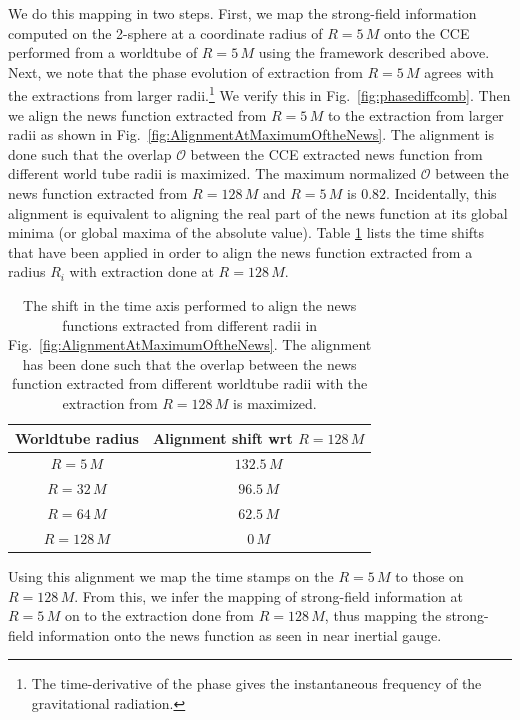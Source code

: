 We do this mapping in two steps. First, we map the strong-field information computed on the 2-sphere at a coordinate radius of $R=5\,M$  onto the CCE performed from a worldtube of  $R=5\,M$ using the framework described above.  Next, we note that the phase evolution of extraction from $R=5\,M$ agrees with the extractions from larger radii.\footnote{The time-derivative of the phase gives the instantaneous frequency of the gravitational radiation.} We verify this in Fig.~\ref{fig:phasediffcomb}. Then we align the news function extracted from $R=5\,M$ to the extraction from larger radii as shown in  Fig.~\ref{fig:AlignmentAtMaximumOftheNews}. The alignment is done such that the overlap $\mathcal{O}$ between the CCE extracted news function from different world tube radii is maximized. The maximum normalized $\mathcal{O}$ between the news function extracted from $R=128\,M$ and $R=5\,M$ is $0.82$. Incidentally, this alignment is equivalent to aligning the real part of the news function at its global minima (or global maxima of the absolute value). Table \ref{tab:Tshift} lists the time shifts that have been applied in order to align the news function extracted from a radius $R_{i}$ with extraction done at $R=128\,M$. 
\begin{table}[!htb]
 \begin{ruledtabular}
    \centering
        \begin{tabular}{ c| c }
Worldtube radius & Alignment shift wrt $R=128\,M$ \\ \hline
$R=5\,M$ & $132.5\,M$ \\
$R=32\,M$ & $96.5\,M$ \\
$R=64\,M$ & $62.5\,M$\\
$R =128\,M$ & $0\,M$
\end{tabular}
        \caption{The shift in the time axis performed to align the news functions extracted from different radii in Fig.~\ref{fig:AlignmentAtMaximumOftheNews}. The alignment has been done such that the overlap between the news function extracted from different worldtube radii with the extraction from $R=128\,M$ is maximized.
        }
\label{tab:Tshift}
 \end{ruledtabular}
\end{table}

Using this alignment we map the time stamps on the $R = 5\,M$ to those on $R= 128\,M$. From this, we infer the mapping of strong-field information at $R=5\,M$ on to the extraction done from $R=128\,M$, thus mapping the strong-field information onto the news function as seen in near inertial gauge. 

